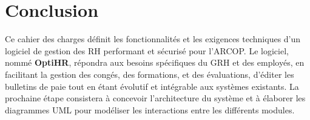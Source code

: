 \section{Conclusion}
Ce cahier des charges définit les fonctionnalités et les exigences techniques d'un logiciel de gestion des \ac{RH} performant et sécurisé pour l'\ac{ARCOP}. Le logiciel, nommé \textbf{OptiHR}, répondra aux besoins spécifiques du GRH et des employés, en facilitant la gestion des congés, des formations, et des évaluations, d'éditer les bulletins de paie tout en étant évolutif et intégrable aux systèmes existants. La prochaine étape consistera à concevoir l'architecture du système et à élaborer les diagrammes UML pour modéliser les interactions entre les différents modules.
\clearpage
